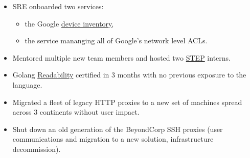 \documentclass[a4paper,sans,colorlinks]{moderncv}
\begin{document}
{\begin{itemize}
\begin{itemize}
\end{itemize}
\item SRE onboarded two services:
\begin{itemize}
\item the Google \href{https://storage.googleapis.com/pub-tools-public-publication-data/pdf/44860.pdf}{device inventory},
\item the service mananging all of Google's network level ACLs.
\end{itemize}
\item Mentored multiple new team members and hosted two
\href{https://careers.google.com/students/engineering-and-technical-internships/}{STEP} interns.
\item Golang \href{https://sback.it/publications/icse2018seip.pdf}{Readability} certified in 3 months with no previous exposure to the language.
\item Migrated a fleet of legacy HTTP proxies to a new set of machines spread across 3 continents without user impact.
\item Shut down an old generation of the BeyondCorp SSH proxies (user communications and migration to a new solution, infrastructure decommission).
\end{itemize}
}
\end{document}
